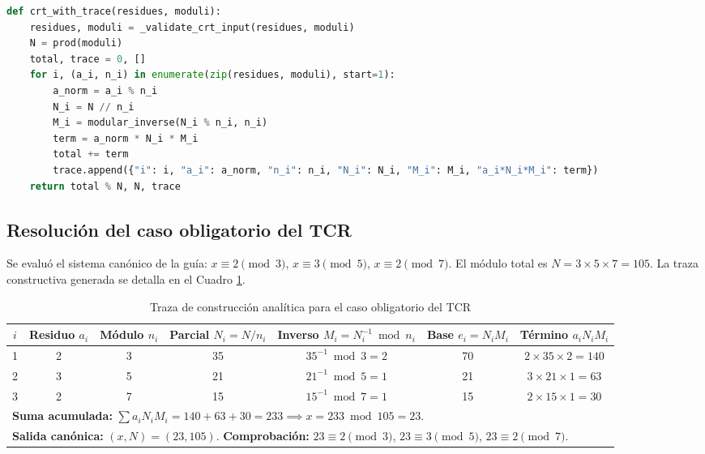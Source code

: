 \begin{lstlisting}[language=Python, caption={Teorema Chino del Resto con traza}, label={lst:crt_code}]
def crt_with_trace(residues, moduli):
    residues, moduli = _validate_crt_input(residues, moduli)
    N = prod(moduli)
    total, trace = 0, []
    for i, (a_i, n_i) in enumerate(zip(residues, moduli), start=1):
        a_norm = a_i % n_i
        N_i = N // n_i
        M_i = modular_inverse(N_i % n_i, n_i)
        term = a_norm * N_i * M_i
        total += term
        trace.append({"i": i, "a_i": a_norm, "n_i": n_i, "N_i": N_i, "M_i": M_i, "a_i*N_i*M_i": term})
    return total % N, N, trace
\end{lstlisting}

\subsection{Resolución del caso obligatorio del TCR}
Se evaluó el sistema canónico de la guía: $x \equiv 2 \pmod 3$, $x \equiv 3 \pmod 5$, $x \equiv 2 \pmod 7$. El módulo total es $N = 3 \times 5 \times 7 = 105$. La traza constructiva generada se detalla en el Cuadro \ref{tab:tcr_caso_obligatorio}.

\begin{table}[H]
    \caption{Traza de construcción analítica para el caso obligatorio del TCR}
    \label{tab:tcr_caso_obligatorio}
    \centering
    \footnotesize
    \begin{tabular*}{\textwidth}{@{\extracolsep{\fill}}ccccccc}
        \toprule
        $i$ & Residuo $a_i$ & Módulo $n_i$ & Parcial $N_i = N/n_i$ & Inverso $M_i = N_i^{-1} \bmod n_i$ & Base $e_i = N_i M_i$ & Término $a_i N_i M_i$ \\
        \midrule
        1 & 2 & 3 & 35 & $35^{-1} \bmod 3 = 2$ & 70 & $2 \times 35 \times 2 = 140$ \\
        2 & 3 & 5 & 21 & $21^{-1} \bmod 5 = 1$ & 21 & $3 \times 21 \times 1 = 63$ \\
        3 & 2 & 7 & 15 & $15^{-1} \bmod 7 = 1$ & 15 & $2 \times 15 \times 1 = 30$ \\
        \midrule
        \multicolumn{7}{l}{\textbf{Suma acumulada:} $\sum a_i N_i M_i = 140 + 63 + 30 = 233 \implies x = 233 \bmod 105 = 23$.} \\
        \multicolumn{7}{l}{\textbf{Salida canónica:} $(x, N) = (23, 105)$. \textbf{Comprobación:} $23 \equiv 2 \pmod 3$, $23 \equiv 3 \pmod 5$, $23 \equiv 2 \pmod 7$.} \\
        \bottomrule
    \end{tabular*}
\end{table}


